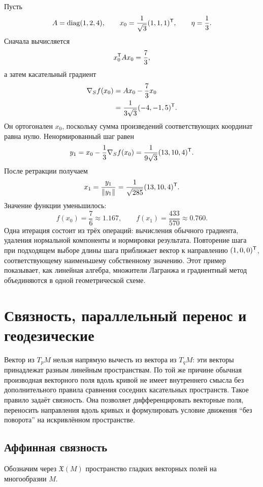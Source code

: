 Пусть
\[
A=\operatorname{diag}(1,2,4),
\qquad
x_0=\frac{1}{\sqrt3}(1,1,1)^{\mathsf{T}},
\qquad
\eta=\frac13.
\]
Сначала вычисляется
\[
x_0^{\mathsf{T}}Ax_0=\frac73,
\]
а затем касательный градиент
\begin{align}
\nabla_S f(x_0)
&=Ax_0-\frac73x_0\notag\\
&=\frac{1}{3\sqrt3}(-4,-1,5)^{\mathsf{T}}.
\label{eq:sphere-gradient-numerical}
\end{align}
Он ортогонален $x_0$, поскольку сумма произведений соответствующих координат равна нулю. Ненормированный шаг равен
\[
y_1
=x_0-\frac13\nabla_S f(x_0)
=\frac{1}{9\sqrt3}(13,10,4)^{\mathsf{T}}.
\]
После ретракции получаем
\begin{equation}
\label{eq:sphere-retracted-step-numerical}
x_1
=\frac{y_1}{\lVert y_1\rVert}
=\frac{1}{\sqrt{285}}(13,10,4)^{\mathsf{T}}.
\end{equation}
Значение функции уменьшилось:
\[
f(x_0)=\frac76\approx1.167,
\qquad
f(x_1)=\frac{433}{570}\approx0.760.
\]
Одна итерация состоит из трёх операций: вычисления обычного градиента, удаления нормальной компоненты и нормировки результата. Повторение шага при подходящем выборе длины шага приближает вектор к направлению $(1,0,0)^{\mathsf{T}}$, соответствующему наименьшему собственному значению. Этот пример показывает, как линейная алгебра, множители Лагранжа и градиентный метод объединяются в одной геометрической схеме.

\section{Связность, параллельный перенос и геодезические}
\label{sec:connections-geodesics}

Вектор из $T_pM$ нельзя напрямую вычесть из вектора из $T_qM$: эти векторы принадлежат разным линейным пространствам. По той же причине обычная производная векторного поля вдоль кривой не имеет внутреннего смысла без дополнительного правила сравнения соседних касательных пространств. Такое правило задаёт связность. Она позволяет дифференцировать векторные поля, переносить направления вдоль кривых и формулировать условие движения ``без поворота'' на искривлённом пространстве.

\subsection{Аффинная связность}

Обозначим через $\mathfrak X(M)$ пространство гладких векторных полей на многообразии $M$.

